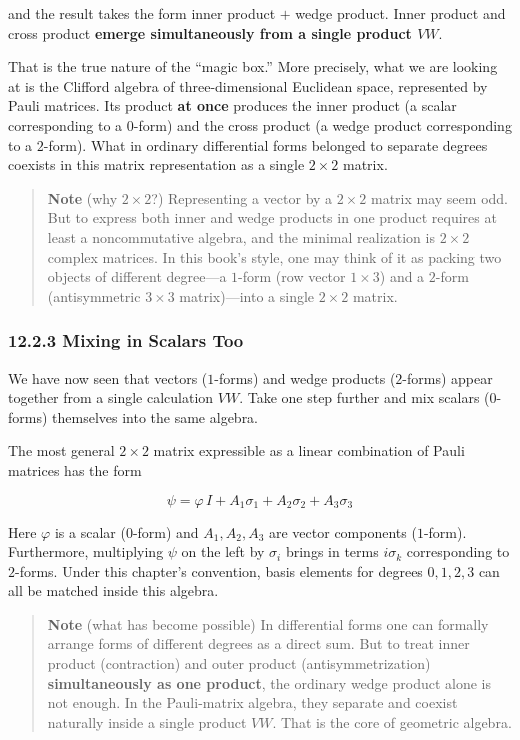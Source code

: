 and the result takes the form inner product \(+\) wedge product. Inner
product and cross product \textbf{emerge simultaneously from a single
product \(VW\)}.

That is the true nature of the ``magic box.'' More precisely, what we
are looking at is the Clifford algebra of three-dimensional Euclidean
space, represented by Pauli matrices. Its product \textbf{at once}
produces the inner product (a scalar corresponding to a \(0\)-form) and
the cross product (a wedge product corresponding to a \(2\)-form). What
in ordinary differential forms belonged to separate degrees coexists in
this matrix representation as a single \(2\times2\) matrix.

\begin{quote}
\textbf{Note} (why \(2\times2\)?) Representing a vector by a
\(2\times2\) matrix may seem odd. But to express both inner and wedge
products in one product requires at least a noncommutative algebra, and
the minimal realization is \(2\times2\) complex matrices. In this book's
style, one may think of it as packing two objects of different
degree---a \(1\)-form (row vector \(1\times3\)) and a \(2\)-form
(antisymmetric \(3\times3\) matrix)---into a single \(2\times2\) matrix.
\end{quote}

\hypertarget{mixing-in-scalars-too}{%
\subsubsection{12.2.3 Mixing in Scalars
Too}\label{mixing-in-scalars-too}}

We have now seen that vectors (\(1\)-forms) and wedge products
(\(2\)-forms) appear together from a single calculation \(VW\). Take one
step further and mix scalars (\(0\)-forms) themselves into the same
algebra.

The most general \(2\times2\) matrix expressible as a linear combination
of Pauli matrices has the form

\[\psi = \varphi\,I + A_1\sigma_1 + A_2\sigma_2 + A_3\sigma_3\]

Here \(\varphi\) is a scalar (\(0\)-form) and \(A_1,A_2,A_3\) are vector
components (\(1\)-form). Furthermore, multiplying \(\psi\) on the left
by \(\sigma_i\) brings in terms \(i\sigma_k\) corresponding to
\(2\)-forms. Under this chapter's convention, basis elements for degrees
\(0,1,2,3\) can all be matched inside this algebra.

\begin{quote}
\textbf{Note} (what has become possible) In differential forms one can
formally arrange forms of different degrees as a direct sum. But to
treat inner product (contraction) and outer product (antisymmetrization)
\textbf{simultaneously as one product}, the ordinary wedge product alone
is not enough. In the Pauli-matrix algebra, they separate and coexist
naturally inside a single product \(VW\). That is the core of geometric
algebra.
\end{quote}

